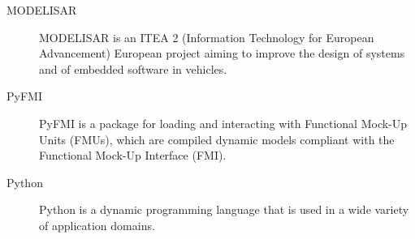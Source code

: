 \documentclass[letterpaper,10pt,english]{sphinxmanual}
\begin{document}
\begin{description}
\item[{MODELISAR}] \leavevmode{}\label{glossary:term-modelisar}
MODELISAR is an ITEA 2 (Information Technology for European Advancement) European project aiming to improve the design of systems and of embedded software in vehicles.

\item[{PyFMI}] \leavevmode{}\label{glossary:term-pyfmi}
PyFMI is a package for loading and interacting with Functional Mock-Up Units (FMUs), which are compiled dynamic models compliant with the Functional Mock-Up Interface (FMI).

\item[{Python}] \leavevmode{}\label{glossary:term-python}
Python is a dynamic programming language that is used in a wide variety of application domains.

\end{description}



\renewcommand{\indexname}{Index}
\printindex
\end{document}
